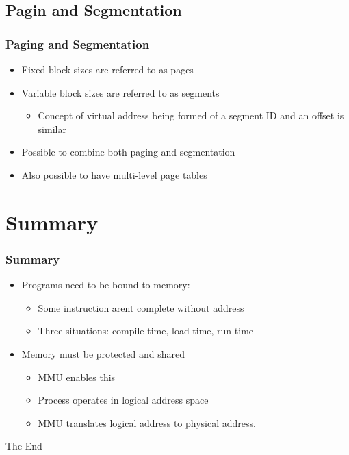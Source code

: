 \documentclass{beamer}
\begin{document}
\subsection{Pagin and Segmentation}
\begin{frame}
\frametitle{Paging and Segmentation}
\begin{itemize}
\item Fixed block sizes are referred to as pages
\item Variable block sizes are referred to as segments
\begin{itemize}
\item Concept of virtual address being formed of a segment ID and an offset is similar
\end{itemize}
\item Possible to combine both paging and segmentation
\item Also possible to have multi-level page tables
\end{itemize}
\end{frame}
\section{Summary}
\begin{frame}
\frametitle{Summary}
\begin{itemize}
\item Programs need to be bound to memory:
\begin{itemize}
\item Some instruction arent complete without address
\item Three situations: compile time, load time, run time
\end{itemize}
\item Memory must be protected and shared
\begin{itemize}
\item MMU enables this
\item Process operates in logical address space
\item MMU translates logical address to physical address.
\end{itemize}
\end{itemize}
\end{frame}

\begin{frame} 
\Huge{\centerline{The End}}
\end{frame}
\end{document}
